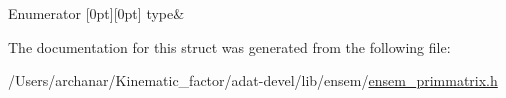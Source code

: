 \begin{DoxyEnumFields}{Enumerator}
[0pt][0pt]{}\mbox{\label{structENSEM_1_1EnsbcIO_3_01PMatrix_3_01T_00_01N_00_01C_01_4_01_4_a674cd01cc2383eb152990b864fcd0f23ab2030d38e88d687f09c823ba14fc80ef}} 
type&\\
\hline

\end{DoxyEnumFields}


The documentation for this struct was generated from the following file\+:\begin{DoxyCompactItemize}
\item 
/\+Users/archanar/\+Kinematic\+\_\+factor/adat-\/devel/lib/ensem/\mbox{\hyperlink{adat-devel_2lib_2ensem_2ensem__primmatrix_8h}{ensem\+\_\+primmatrix.\+h}}\end{DoxyCompactItemize}
